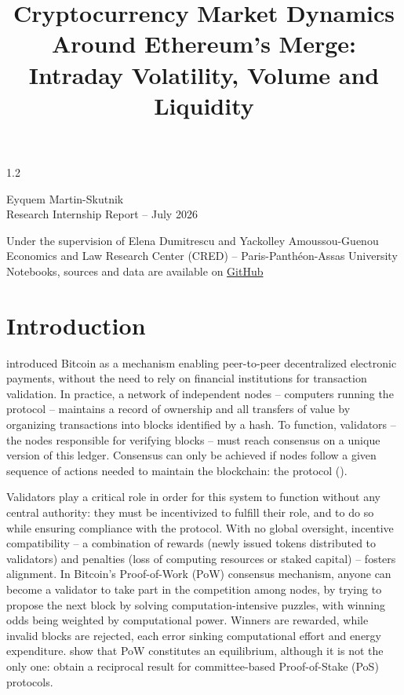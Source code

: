 \documentclass[10pt]{article}
\title{\Large \textbf{Cryptocurrency Market Dynamics Around Ethereum's Merge: \\Intraday Volatility, Volume and Liquidity}}
\date{}
\author{}
\begin{document}
\begin{setstretch}{1.2} %

\maketitle

\begin{center}
    \vspace{-1.5cm}
    Eyquem Martin-Skutnik \\
    Research Internship Report -- July 2026 \bigskip
    
    Under the supervision of Elena Dumitrescu and Yackolley Amoussou-Guenou \\
    Economics and Law Research Center (CRED) -- Paris-Panthéon-Assas University \\
    Notebooks, sources and data are available on \href{https://github.com/e1quem/CRED}{GitHub}
    \vspace{1cm}
\end{center}


\section{Introduction}

\textcite{Nakamoto2008} introduced Bitcoin as a mechanism enabling peer-to-peer decentralized electronic payments, without the need to rely on financial institutions for transaction validation. In practice, a network of independent nodes -- computers running the protocol -- maintains a record of ownership and all transfers of value by organizing transactions into blocks identified by a hash. To function, validators -- the nodes responsible for verifying blocks -- must reach consensus on a unique version of this ledger. Consensus can only be achieved if nodes follow a given sequence of actions needed to maintain the blockchain: the protocol (\cite{AmoussouGuenou2026}).

Validators play a critical role in order for this system to function without any central authority: they must be incentivized to fulfill their role, and to do so while ensuring compliance with the protocol. With no global oversight, incentive compatibility -- a combination of rewards (newly issued tokens distributed to validators) and penalties (loss of computing resources or staked capital) -- fosters alignment. In Bitcoin's Proof-of-Work (PoW) consensus mechanism, anyone can become a validator to take part in the competition among nodes, by trying to propose the next block by solving computation-intensive puzzles, with winning odds being weighted by computational power. Winners are rewarded, while invalid blocks are rejected, each error sinking computational effort and energy expenditure. \textcite{Biais2019} show that PoW constitutes an equilibrium, although it is not the only one: \textcite{AmoussouGuenou2024} obtain a reciprocal result for committee-based Proof-of-Stake (PoS) protocols.


\end{setstretch}
\end{document}
